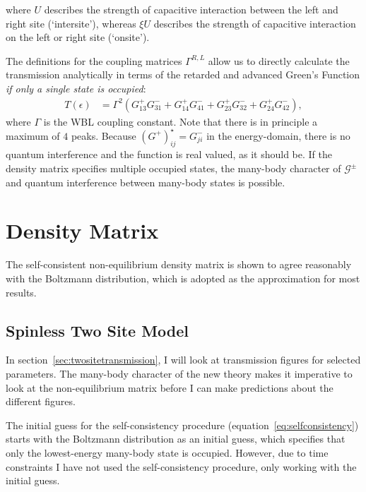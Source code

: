 where $U$ describes the strength of capacitive interaction between the left and right site (`intersite'), whereas $\xi U$ describes the strength of capacitive interaction on the left or right site (`onsite').

The definitions for the coupling matrices $\Gamma^{R,L}$ allow us to directly calculate the transmission analytically in terms of the retarded and advanced Green's Function \emph{if only a single state is occupied}:
\begin{align*}
T(\epsilon) &= \Gamma^2 \left( G^+_{13} G^-_{31} + G^+_{14} G^-_{41} + G^+_{23} G^-_{32} + G^+_{24} G^-_{42} \right),
\end{align*}
where $\Gamma$ is the WBL coupling constant. Note that there is in principle a maximum of $4$ peaks. Because $\left(G^+\right)_{ij}^\star = G^-_{ji}$ in the energy-domain, there is no quantum interference and the function is real valued, as it should be. If the density matrix specifies multiple occupied states, the many-body character of $\mathscr{G}^\pm$ and quantum interference between many-body states is possible.

\section{Density Matrix}
\label{sec:dmapprox}
The self-consistent non-equilibrium density matrix is shown to agree reasonably with the Boltzmann distribution, which is adopted as the approximation for most results.
\subsection{Spinless Two Site Model}
In section~\ref{sec:twositetransmission}, I will look at transmission figures for selected parameters. The many-body character of the new theory makes it imperative to look at the non-equilibrium matrix before I can make predictions about the different figures.

The initial guess for the self-consistency procedure (equation~\ref{eq:selfconsistency}) starts with the Boltzmann distribution as an initial guess, which specifies that only the lowest-energy many-body state is occupied. However, due to time constraints I have not used the self-consistency procedure, only working with the initial guess.

